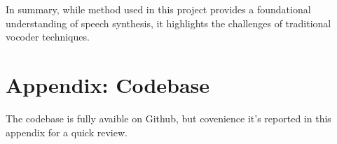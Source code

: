 \documentclass[12pt]{article}
\begin{document}
In summary, while method used in this project provides a foundational understanding of speech synthesis, it highlights the challenges of traditional vocoder techniques.


\newpage



\section{Appendix: Codebase}

The codebase is fully avaible on Github, but covenience it's reported in this appendix for a quick review.
\end{document}
